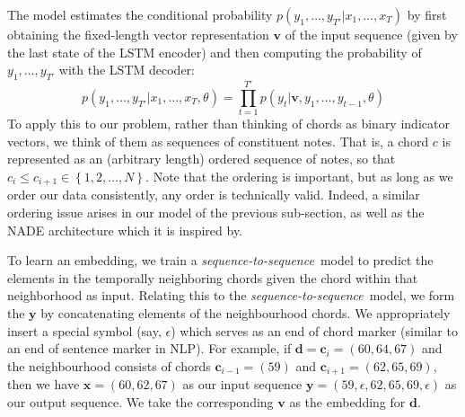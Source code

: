 \documentclass{article}
\newcommand{\N}{\mathcal{N}}
\newcommand{\T}{\mathcal{T}}
\newcommand{\boldc}{\boldsymbol c}
\newcommand{\boldd}{\boldsymbol d}
\newcommand{\boldy}{\boldsymbol y}
\newcommand{\boldx}{\boldsymbol x}
\newcommand{\seqtoseq}{\textit{sequence-to-sequence}}
\begin{document}
The model estimates the conditional probability $p(y_1,\ldots,y_{T'} | x_1, \ldots, x_T)$ by first obtaining the fixed-length vector representation $\boldsymbol{v}$ of the input sequence (given by the last state of the LSTM encoder) and then computing the probability of $y_1,\ldots,y_{T'} $ with the LSTM decoder: 
%
\begin{equation}
p(y_1,\ldots,y_{T'} | x_1, \ldots, x_T,\theta) = \prod_{t=1}^{T'} p(y_t|\boldsymbol{v}, y_1,\ldots,y_{t-1},\theta)
\end{equation}
%
%
To apply this to our problem, rather than thinking of chords as binary indicator vectors, we think of them as sequences of constituent notes. That is, a chord $c$ is represented as an (arbitrary length) ordered sequence of notes, so that $c_i\leq c_{i+1}\in\left\{1,2,\dots,N\right\}$. Note that the ordering is important, but as long as we order our data consistently, any order is technically valid. Indeed, a similar ordering issue arises in our model of the previous sub-section, as well as the NADE architecture which it is inspired by.

To learn an embedding, we train a \seqtoseq\ model to predict the elements in the temporally neighboring chords given the chord within that neighborhood as input.
Relating this to the \seqtoseq\ model, we form the $\boldsymbol{y}$ by concatenating elements of the neighbourhood chords. We appropriately insert a special symbol (say, $\epsilon$) which serves as an end of chord marker (similar to an end of sentence marker in NLP). For example, if $\boldd=\boldc_i=(60,64,67)$ and the neighbourhood consists of chords $\boldc_{i-1}=(59)$ and $\boldc_{i+1}=(62,65,69)$, then we have $\boldx=(60,62,67)$ as our input sequence $\boldy=(59,\epsilon,62,65,69,\epsilon)$ as our output sequence. We take the corresponding $\boldsymbol{v}$ as the embedding for $\boldd$.
%
%
%
%
\end{document}
